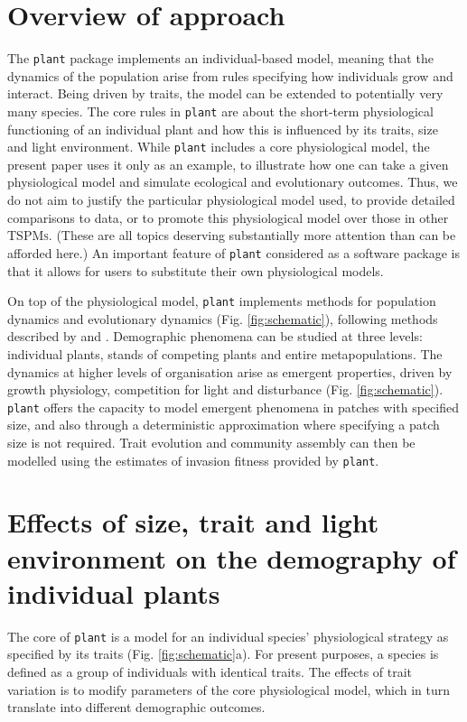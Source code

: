 \documentclass[a4paper,11pt]{article}
\newcommand{\plant}{\texttt{plant}}
\begin{document}
\section{Overview of approach}

The {\plant} package implements an individual-based model, meaning that the dynamics of the
population arise from rules specifying how individuals grow and interact.
Being driven by traits, the model can be extended to potentially very many species. The
core rules in {\plant} are about the short-term physiological
functioning of an individual plant and how this is influenced by its
traits, size and light environment. While {\plant} includes a core physiological model, the present paper uses it only as an example, to illustrate how one can take a given physiological model and simulate ecological and evolutionary outcomes. Thus, we do not aim to justify the particular physiological model used, to provide detailed
comparisons to data, or to promote this physiological model over those
in other \textsc{TSPMs}. (These are all topics deserving substantially
more attention than can be afforded here.)
An important feature of {\plant} considered as a software package is that it allows for users to substitute their own physiological models.

On top of the physiological model, {\plant} implements methods for
population dynamics and evolutionary dynamics (Fig. \ref{fig:schematic}), following methods
described by \citet{Falster-2011} and \citet{Falster-2015}. Demographic
phenomena can be studied at three levels: individual plants, stands of
competing plants and entire metapopulations. The dynamics at higher
levels of organisation arise as emergent properties, driven by growth
physiology, competition for light and disturbance (Fig. \ref{fig:schematic}).
{\plant} offers the capacity to model emergent phenomena in patches with
specified size, and also through a deterministic approximation
where specifying a patch size is not required. Trait evolution and community
assembly can then be modelled using the estimates of invasion fitness
provided by {\plant}.

\section{Effects of size, trait and light environment on the demography of individual plants}

The core of {\plant} is a model for an individual species' physiological
strategy as specified by its traits (Fig. \ref{fig:schematic}a). For
present purposes, a species is defined as a group of individuals with identical
traits. The effects of trait variation is to modify parameters of the core
physiological model, which in turn translate into different demographic outcomes.
\end{document}
